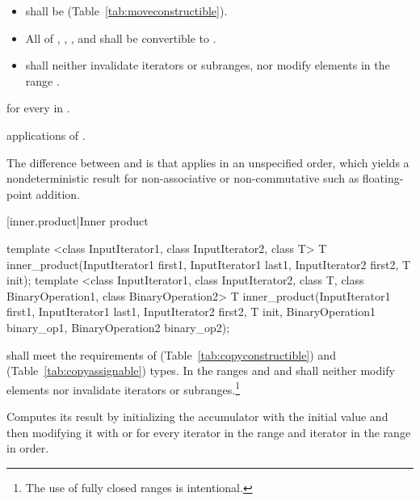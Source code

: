 \begin{itemdescr}
\pnum
\requires
\begin{itemize}
\item {} shall be  (Table~\ref{tab:moveconstructible}).
\item All of , ,
, and  shall be
convertible to .
\item {} shall neither invalidate iterators or subranges, nor modify
elements in the range .
\end{itemize}

\pnum
\returns
{} for every  in .

\pnum
\complexity
{} applications of .

\pnum
\begin{note}
The difference between  and  is that
 applies  in an unspecified order, which yields
a nondeterministic result for non-associative or non-commutative
 such as floating-point addition.
\end{note}
\end{itemdescr}

[inner.product]{Inner product}

%
\begin{itemdecl}
template <class InputIterator1, class InputIterator2, class T>
  T inner_product(InputIterator1 first1, InputIterator1 last1,
                  InputIterator2 first2, T init);
template <class InputIterator1, class InputIterator2, class T,
          class BinaryOperation1, class BinaryOperation2>
  T inner_product(InputIterator1 first1, InputIterator1 last1,
                  InputIterator2 first2, T init,
                  BinaryOperation1 binary_op1,
                  BinaryOperation2 binary_op2);
\end{itemdecl}

\begin{itemdescr}
\pnum
\requires
{} shall meet the requirements of  (Table~\ref{tab:copyconstructible})
and  (Table~\ref{tab:copyassignable}) types.
In the ranges
and
and
shall neither modify elements nor invalidate iterators or subranges.\footnote{The use of fully closed ranges is intentional.}

\pnum
\effects
Computes its result by initializing the accumulator
with the initial value
and then modifying it with
or
for every iterator
in the range 
and iterator
in the range
in order.
\end{itemdescr}

